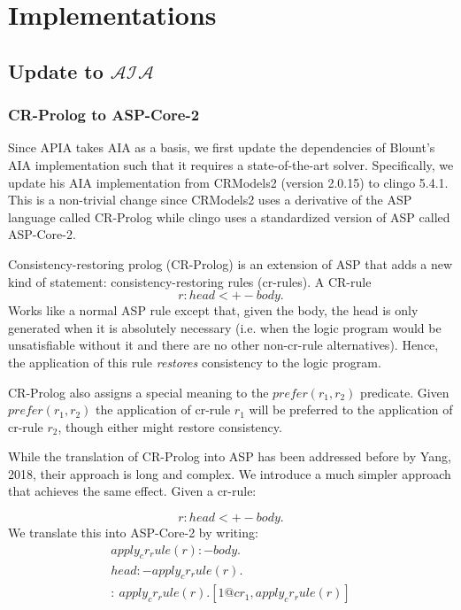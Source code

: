 \chapter{Implementations}

%

\section{Update to $\mathcal{AIA}$}

\subsection{CR-Prolog to ASP-Core-2}

Since APIA takes AIA as a basis, we first update the dependencies of Blount's AIA implementation such that it requires a state-of-the-art solver.
Specifically, we update his AIA implementation from CRModels2 (version 2.0.15) to clingo 5.4.1.
This is a non-trivial change since CRModels2 uses a derivative of the ASP language called CR-Prolog while clingo uses a standardized version of ASP called ASP-Core-2.

Consistency-restoring prolog (CR-Prolog) is an extension of ASP that adds a new kind of statement: consistency-restoring rules (cr-rules).
A CR-rule
\begin{equation}
    r: head <+- body.
\end{equation}
Works like a normal ASP rule except that, given the body, the head is only generated when it is absolutely necessary (i.e. when the logic program would be unsatisfiable without it and there are no other non-cr-rule alternatives).
Hence, the application of this rule \textit{restores} consistency to the logic program.

CR-Prolog also assigns a special meaning to the $prefer(r_1, r_2)$ predicate.
Given $prefer(r_1, r_2)$ the application of cr-rule $r_1$ will be preferred to the application of cr-rule $r_2$, though either might restore consistency.

While the translation of CR-Prolog into ASP has been addressed before by Yang, 2018, their approach is long and complex.
We introduce a much simpler approach that achieves the same effect.
Given a cr-rule:

\begin{equation}
    r: head <+- body.
\end{equation}
We translate this into ASP-Core-2 by writing:
\begin{gather}
    apply_cr_rule(r) :- body. \\
    head :- apply_cr_rule(r). \\
    :~ apply_cr_rule(r).
    [1@cr_1, apply_cr_rule(r)]
\end{gather}

